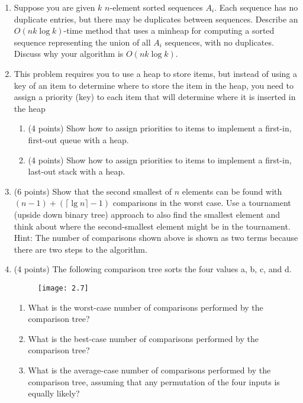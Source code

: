 \documentclass[2]{cs430homework}
\begin{document}
\begin{enumerate}[label=\arabic*.]
	\item Suppose you are given $k$ $n$-element sorted sequences $A_{i}$. Each sequence has no duplicate entries, but there may be duplicates between sequences. Describe an $O(nk \log k)$-time method that uses a minheap for computing a sorted sequence representing the union of all $A_{i}$ sequences, with no duplicates. Discuss why your algorithm is $O(nk \log k)$.
	\item This problem requires you to use a heap to store items, but instead of using a key of an item to determine where to store the item in the heap, you need to assign a priority (key) to each item that will determine where it is inserted in the heap
	\begin{enumerate}[label=\arabic{enumi}\alph*)]
	    \item (4 points) Show how to assign priorities to items to implement a first-in, first-out queue with a heap.
		\item (4 points) Show how to assign priorities to items to implement a first-in, last-out stack with a heap.
	\end{enumerate}
	\item (6 points) Show that the second smallest of $n$ elements can be found with $(n-1) + (\lceil \lg n \rceil-1)$ comparisons in the worst case. Use a tournament (upside down binary tree) approach to also find the smallest element and think about where the second-smallest element might be in the tournament. Hint: The number of comparisons shown above is shown as two terms because there are two steps to the algorithm.
	\item (4 points) The following comparison tree sorts the four values a, b, c, and d.
	\begin{figure}[H]
		\centering
		\texttt{[image: 2.7]}
		\caption{}
		\label{fig:2.7}
	\end{figure}
	\begin{enumerate}[label=\arabic{enumi}\alph*)]
		\item What is the worst-case number of comparisons performed by the comparison tree?
		\item What is the best-case number of comparisons performed by the comparison tree?
		\item What is the average-case number of comparisons performed by the comparison tree, assuming that any permutation of the four inputs is equally likely?
	\end{enumerate}
\end{enumerate}

\end{document}
